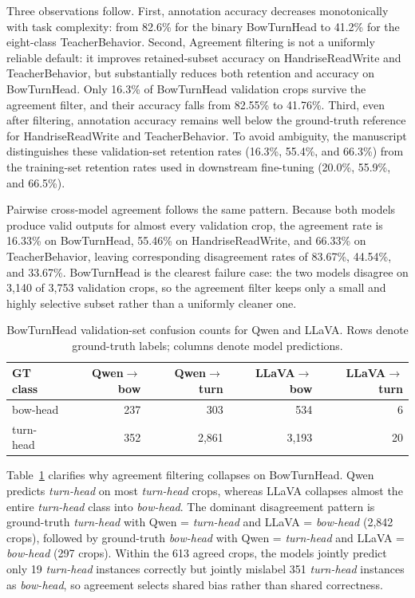 \documentclass[10pt,letterpaper]{article}
\begin{document}
Three observations follow.
First, annotation accuracy decreases monotonically with task
complexity: from 82.6\% for the binary BowTurnHead to 41.2\% for the
eight-class TeacherBehavior.
Second, Agreement filtering is not a uniformly reliable default: it improves
retained-subset accuracy on HandriseReadWrite and TeacherBehavior, but
substantially reduces both retention and accuracy on BowTurnHead.
Only 16.3\% of BowTurnHead validation crops survive the agreement
filter, and their accuracy falls from 82.55\% to 41.76\%.
Third, even after filtering, annotation accuracy remains well below the
ground-truth reference for HandriseReadWrite and TeacherBehavior.
To avoid ambiguity, the manuscript distinguishes these validation-set
retention rates (16.3\%, 55.4\%, and 66.3\%) from the training-set
retention rates used in downstream fine-tuning (20.0\%, 55.9\%, and
66.5\%).

Pairwise cross-model agreement follows the same pattern. Because both
models produce valid outputs for almost every validation crop, the
agreement rate is 16.33\% on BowTurnHead, 55.46\% on
HandriseReadWrite, and 66.33\% on TeacherBehavior, leaving
corresponding disagreement rates of 83.67\%, 44.54\%, and 33.67\%.
BowTurnHead is the clearest failure case: the two models disagree on
3{,}140 of 3{,}753 validation crops, so the agreement filter keeps only
a small and highly selective subset rather than a uniformly cleaner one.

\begin{table}[H]
\caption{BowTurnHead validation-set confusion counts for Qwen and
LLaVA. Rows denote ground-truth labels; columns denote model
predictions.}
\label{tab:bow_confusion}
\centering
\begin{tabular}{lrrrr}
\toprule
\textbf{GT class} & \textbf{Qwen$\to$bow} & \textbf{Qwen$\to$turn} & \textbf{LLaVA$\to$bow} & \textbf{LLaVA$\to$turn} \\
\midrule
bow-head  & 237 & 303 & 534 & 6 \\
turn-head & 352 & 2{,}861 & 3{,}193 & 20 \\
\bottomrule
\end{tabular}
\end{table}

Table~\ref{tab:bow_confusion} clarifies why agreement filtering
collapses on BowTurnHead. Qwen predicts \textit{turn-head} on most
\textit{turn-head} crops, whereas LLaVA collapses almost the entire
\textit{turn-head} class into \textit{bow-head}. The dominant
disagreement pattern is ground-truth \textit{turn-head} with
Qwen = \textit{turn-head} and LLaVA = \textit{bow-head}
(2{,}842 crops), followed by ground-truth \textit{bow-head} with
Qwen = \textit{turn-head} and LLaVA = \textit{bow-head}
(297 crops). Within the 613 agreed crops, the models jointly predict
only 19 \textit{turn-head} instances correctly but jointly mislabel
351 \textit{turn-head} instances as \textit{bow-head}, so agreement
selects shared bias rather than shared correctness.
\end{document}

